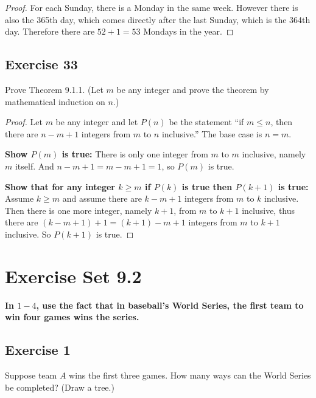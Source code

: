 \documentclass[14pt]{extarticle}
\newcommand{\cy}{\color{cyan}}
\begin{document}
\begin{proof}
     For each Sunday, there is a Monday in the same week. However there is also the 365th day, which comes directly
     after the last Sunday, which is the 364th day. Therefore there are \(52 + 1 = 53\) Mondays in the year.
\end{proof}

\subsection{Exercise 33}
Prove Theorem 9.1.1. (Let $m$ be any integer and prove the theorem by mathematical induction on $n$.)

\begin{proof}
     Let $m$ be any integer and let \(P(n)\) be the statement ``if \(m \leq n\), then there are \(n - m + 1\) integers
     from $m$ to $n$ inclusive.'' The base case is \(n=m\).

          {\bf Show $P(m)$ is true:} There is only one integer from $m$ to $m$ inclusive, namely $m$ itself. And \(n - m + 1
     = m - m + 1 = 1\), so $P(m)$ is true.

          {\bf Show that for any integer \(k \geq m\) if \(P(k)\) is true then \(P(k+1)\) is true:} Assume \(k \geq m\) and
     assume there are \(k-m+1\) integers from $m$ to $k$ inclusive. Then there is one more integer, namely \(k+1\),
     from $m$ to $k+1$ inclusive, thus there are \((k-m+1)+1 = (k+1)-m+1\) integers from $m$ to $k+1$ inclusive. So
     \(P(k+1)\) is true.
\end{proof}

\section{Exercise Set 9.2}
 {\bf \cy In $1-4$, use the fact that in baseball’s World Series, the first team to win four games wins the series.}

\subsection{Exercise 1}
Suppose team $A$ wins the first three games. How many ways can the World Series be completed? (Draw a tree.)
\end{document}
